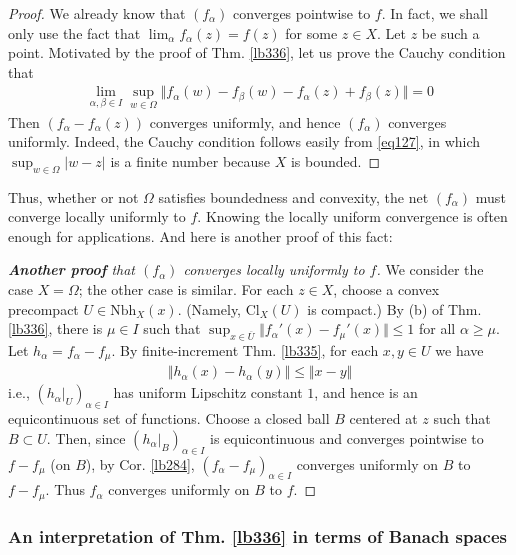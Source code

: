 \documentclass[12pt,b5paper,notitlepage]{article}
\theoremstyle{definition}
\theoremstyle{plain}
\newcommand{\ovl}{\overline}
\newcommand{\Nbh}{\mathrm{Nbh}}
\newcommand{\Cl}{\mathrm{Cl}}
\numberwithin{equation}{section}
\begin{document}
\begin{proof}
We already know that $(f_\alpha)$ converges pointwise to $f$. In fact, we shall only use the fact that $\lim_\alpha f_\alpha(z)=f(z)$  for some $z\in X$. Let $z$ be such a point. Motivated by the proof of Thm. \ref{lb336}, let us prove  the Cauchy condition that
\begin{align*}
\lim_{\alpha,\beta\in I}\sup_{w\in\Omega}\Vert f_\alpha(w)-f_\beta(w)-f_\alpha(z)+f_\beta(z)\Vert=0
\end{align*}
Then $(f_\alpha-f_\alpha(z))$ converges uniformly, and hence $(f_\alpha)$ converges uniformly. Indeed, the Cauchy condition follows easily from \eqref{eq127}, in which $\sup_{w\in\Omega}|w-z|$ is a finite number because $X$ is bounded.
\end{proof}


Thus, whether or not $\Omega$ satisfies boundedness and convexity, the net $(f_\alpha)$ must converge locally uniformly to $f$. Knowing the locally uniform convergence is often enough for applications. And here is another proof of this fact:

\begin{proof}[\textbf{Another proof} that $(f_\alpha)$ converges locally uniformly to $f$]
We consider the case $X=\Omega$; the other case is similar. For each $z\in X$, choose a convex precompact $U\in\Nbh_X(x)$. (Namely, $\Cl_X(U)$ is compact.) By (b) of Thm. \ref{lb336}, there is $\mu\in I$ such that $\sup_{x\in\ovl U}\Vert f_\alpha'(x)-f_\mu'(x)\Vert\leq 1$ for all $\alpha\geq\mu$. Let $h_\alpha=f_\alpha-f_\mu$. By finite-increment Thm. \ref{lb335}, for each $x,y\in U$ we have
\begin{align*}
\Vert h_\alpha(x)-h_\alpha(y)\Vert\leq \Vert x-y\Vert
\end{align*}
i.e., $(h_\alpha|_U)_{\alpha\in I}$ has uniform Lipschitz constant $1$, and hence is an equicontinuous set of functions. Choose a closed ball $B$ centered at $z$ such that $B\subset U$. Then, since $(h_\alpha|_B)_{\alpha\in I}$ is equicontinuous and converges pointwise to $f-f_\mu$ (on $B$), by Cor. \ref{lb284}, $(f_\alpha-f_\mu)_{\alpha\in I}$ converges uniformly on $B$ to $f-f_\mu$. Thus $f_\alpha$ converges uniformly on $B$ to $f$.
\end{proof}



\subsubsection{An interpretation of Thm. \ref{lb336} in terms of Banach spaces}
\end{document}

